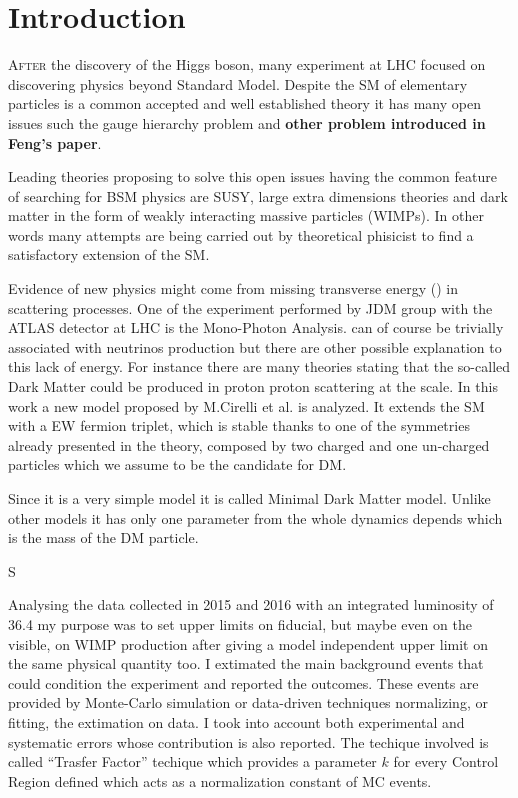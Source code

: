 {\frontmatter
  \chapter{\selectfont Introduction}
  \lettrine{A}{fter} the discovery of the Higgs boson, many experiment at LHC focused on discovering physics beyond Standard Model. Despite the SM of elementary particles is a common accepted and well established theory it has many open issues such the gauge hierarchy problem and {\bfseries other problem introduced in Feng's paper}.
  
  Leading theories proposing to solve this open issues having the common feature of searching for BSM physics are SUSY, large extra dimensions theories and dark matter in the form of weakly interacting massive particles (WIMPs). In other words many attempts are being carried out by theoretical phisicist to find a satisfactory extension of the SM.

  Evidence of new physics might come from missing transverse energy (\MET) in scattering processes. One of the experiment performed by JDM group with the ATLAS detector at LHC is the Mono-Photon Analysis. \MET can of course be trivially associated with neutrinos production but there are other possible explanation to this lack of energy. For instance there are many theories stating that the so-called Dark Matter could be produced in proton proton scattering at the \TeV scale. In this work a new model proposed by M.Cirelli et al. is analyzed. It extends the SM with a EW fermion triplet, which is stable thanks to one of the symmetries already presented in the theory, composed by two charged and one un-charged particles which we assume to be the candidate for DM.

  Since it is a very simple model it is called Minimal Dark Matter model. Unlike other models it has only one parameter from the whole dynamics depends which is the mass of the DM particle.
  
  S  

  Analysing the data collected in 2015 and 2016 with an integrated luminosity of 36.4 \ifb my purpose was to set upper limits on fiducial, but maybe even on the visible, on WIMP production after giving a model independent upper limit on the same physical quantity too. I extimated the main background events that could condition the experiment and reported the outcomes. These events are provided by Monte-Carlo simulation or data-driven techniques normalizing, or fitting, the extimation on data. I took into account both experimental and systematic errors whose contribution is also reported. The techique involved is called ``Trasfer Factor'' techique which provides a parameter $k$ for every Control Region defined which acts as a normalization constant of MC events. 

}
